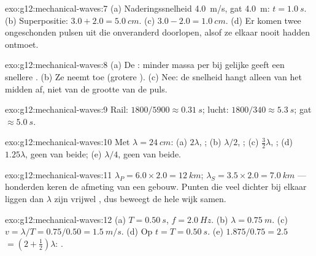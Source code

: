 \begin{solution}{exo:g12:mechanical-waves:7}
(a) Naderingssnelheid \qty{4.0}{m/s}, gat \qty{4.0}{m}:
$t = \qty{1.0}{s}$. (b) Superpositie: $3.0 + 2.0 = \qty{5.0}{cm}$.
(c) $3.0 - 2.0 = \qty{1.0}{cm}$. (d) Er komen twee ongeschonden pulsen
uit die onveranderd doorlopen, alsof ze elkaar nooit hadden ontmoet.
\end{solution}

\begin{solution}{exo:g12:mechanical-waves:8}
(a) De : minder massa per  bij gelijke  geeft een
snellere . (b) Ze neemt toe (grotere ). (c) Nee: de
snelheid hangt alleen van het midden af, niet van de grootte van de puls.
\end{solution}

\begin{solution}{exo:g12:mechanical-waves:9}
Rail: $1800/5900 \approx \qty{0.31}{s}$; lucht:
$1800/340 \approx \qty{5.3}{s}$; gat $\approx \qty{5.0}{s}$.
\end{solution}

\begin{solution}{exo:g12:mechanical-waves:10}
Met $\lambda = \qty{24}{cm}$: (a) $2\lambda$, ; (b) $\lambda/2$,
; (c) $\tfrac32\lambda$, ; (d) $1.25\lambda$,
geen van beide; (e) $\lambda/4$, geen van beide.
\end{solution}

\begin{solution}{exo:g12:mechanical-waves:11}
$\lambda_P = 6.0 \times 2.0 = \qty{12}{km}$;
$\lambda_S = 3.5 \times 2.0 = \qty{7.0}{km}$ --- honderden keren de
afmeting van een gebouw. Punten die veel dichter bij elkaar liggen dan
$\lambda$ zijn vrijwel , dus beweegt de hele wijk samen.
\end{solution}

\begin{solution}{exo:g12:mechanical-waves:12}
(a) $T = \qty{0.50}{s}$, $f = \qty{2.0}{Hz}$.
(b) $\lambda = \qty{0.75}{m}$.
(c) $v = \lambda/T = 0.75/0.50 = \qty{1.5}{m/s}$.
(d) Op $t = T = \qty{0.50}{s}$. (e) $1.875/0.75 = 2.5$ 
$= (2 + \tfrac12)\lambda$: .
\end{solution}

